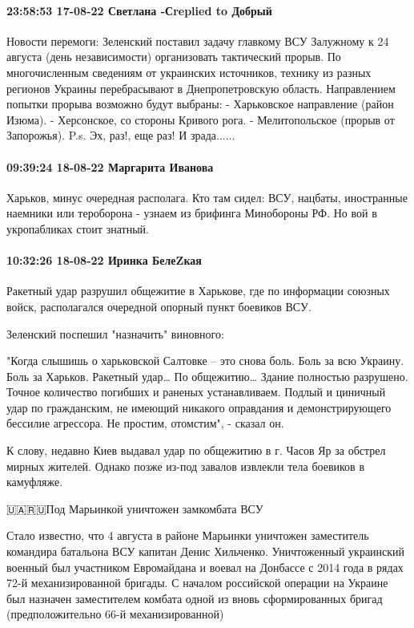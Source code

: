 \paragraph{23:58:53 17-08-22 Светлана -Сreplied to Добрый}

Новости перемоги:
Зеленский поставил задачу главкому ВСУ Залужному к 24 августа (день независимости) организовать тактический прорыв.
По многочисленным сведениям от украинских источников, технику из разных регионов Украины перебрасывают в Днепропетровскую область. Направлением попытки прорыва возможно будут выбраны:
- Харьковское направление (район Изюма).
- Херсонское, со стороны Кривого рога.
- Мелитопольское (прорыв от Запорожья).
P.s. Эх, раз!, еще раз! И зрада......

\paragraph{09:39:24 18-08-22 Маргарита Иванова}

Харьков, минус очередная располага. Кто там сидел: ВСУ, нацбаты, иностранные
наемники или тероборона - узнаем из брифинга Минобороны РФ. Но вой в
укропабликах стоит знатный.

\paragraph{10:32:26 18-08-22 Иринка БелеZкая}

Ракетный удар разрушил общежитие в Харькове, где по информации союзных войск,
располагался очередной опорный пункт боевиков ВСУ.

Зеленский поспешил "назначить" виновного:

"Когда слышишь о харьковской Салтовке – это снова боль. Боль за всю Украину.
Боль за Харьков. Ракетный удар… По общежитию… Здание полностью разрушено.
Точное количество погибших и раненых устанавливаем. Подлый и циничный удар по
гражданским, не имеющий никакого оправдания и демонстрирующего бессилие
агрессора. Не простим, отомстим", - сказал он.

К слову, недавно Киев выдавал удар по общежитию в г. Часов Яр за обстрел мирных
жителей. Однако позже из-под завалов извлекли тела боевиков в камуфляже.

🇺🇦🇷🇺Под Марьинкой уничтожен замкомбата ВСУ

Стало известно, что 4 августа в районе Марьинки уничтожен заместитель командира
батальона ВСУ капитан Денис Хильченко. Уничтоженный украинский военный был
участником Евромайдана и воевал на Донбассе с 2014 года в рядах 72-й
механизированной бригады. С началом российской операции на Украине был назначен
заместителем комбата одной из вновь сформированных бригад (предположительно
66-й механизированной)


